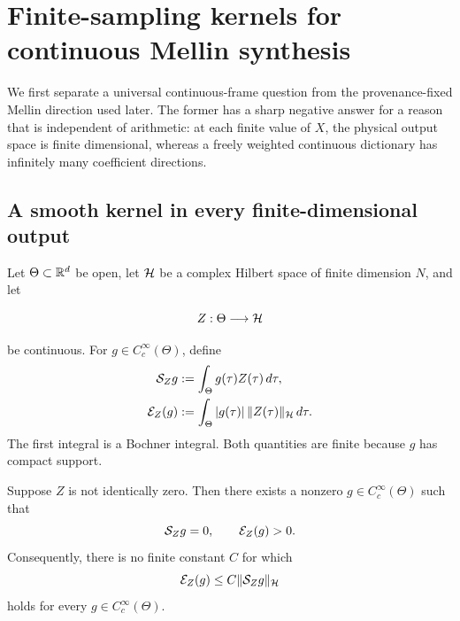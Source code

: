 \section{Finite-sampling kernels for continuous Mellin synthesis}
\label{sec:tpc51-continuous-kernels}

We first separate a universal continuous-frame question from the
provenance-fixed Mellin direction used later.  The former has a sharp
negative answer for a reason that is independent of arithmetic: at each
finite value of \(X\), the physical output space is finite dimensional,
whereas a freely weighted continuous dictionary has infinitely many
coefficient directions.

\subsection{A smooth kernel in every finite-dimensional output}

Let \(\Theta\subset\mathbb R^d\) be open, let \(\mathcal H\) be a complex Hilbert
space of finite dimension \(N\), and let

\[
 Z:\Theta\longrightarrow\mathcal H
\]

be continuous.  For \(g\in C_c^\infty(\Theta)\), define
\begin{align}
 \mathcal S_Zg&:=\int_\Theta g(\tau)Z(\tau)\,d\tau,
 \label{eq:tpc51-continuous-synthesis}\\
 \mathcal E_Z(g)&:=\int_\Theta |g(\tau)|\,\|Z(\tau)\|_\mathcal H\,d\tau.
 \label{eq:tpc51-continuous-envelope}
\end{align}
The first integral is a Bochner integral.  Both quantities are finite
because \(g\) has compact support.

\begin{theorem}
\label{thm:tpc51-smooth-kernel}
Suppose \(Z\) is not identically zero.  Then there exists a nonzero
\(g\in C_c^\infty(\Theta)\) such that
\begin{equation}
 \mathcal S_Zg=0,
 \qquad
 \mathcal E_Z(g)>0.
 \label{eq:tpc51-smooth-kernel}
\end{equation}
Consequently, there is no finite constant \(C\) for which
\begin{equation}
 \mathcal E_Z(g)\le C\|\mathcal S_Zg\|_\mathcal H
 \label{eq:tpc51-false-universal-frame}
\end{equation}
holds for every \(g\in C_c^\infty(\Theta)\).
\end{theorem}

